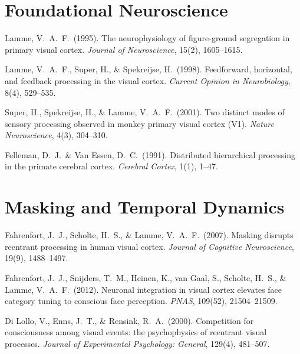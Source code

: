 \documentclass[11pt,a4paper]{report}
\begin{document}
\section*{Foundational Neuroscience}
\begin{enumerate}[label={[\arabic*]}, leftmargin=2.5em, start=6]
  \item Lamme, V.\ A.\ F.\ (1995). The neurophysiology of figure-ground segregation in primary visual cortex. \textit{Journal of Neuroscience}, 15(2), 1605--1615.
  \item Lamme, V.\ A.\ F., Super, H., \& Spekreijse, H.\ (1998). Feedforward, horizontal, and feedback processing in the visual cortex. \textit{Current Opinion in Neurobiology}, 8(4), 529--535.
  \item Super, H., Spekreijse, H., \& Lamme, V.\ A.\ F.\ (2001). Two distinct modes of sensory processing observed in monkey primary visual cortex (V1). \textit{Nature Neuroscience}, 4(3), 304--310.
  \item Felleman, D.\ J.\ \& Van Essen, D.\ C.\ (1991). Distributed hierarchical processing in the primate cerebral cortex. \textit{Cerebral Cortex}, 1(1), 1--47.
\end{enumerate}

\section*{Masking and Temporal Dynamics}
\begin{enumerate}[label={[\arabic*]}, leftmargin=2.5em, start=10]
  \item Fahrenfort, J.\ J., Scholte, H.\ S., \& Lamme, V.\ A.\ F.\ (2007). Masking disrupts reentrant processing in human visual cortex. \textit{Journal of Cognitive Neuroscience}, 19(9), 1488--1497.
  \item Fahrenfort, J.\ J., Snijders, T.\ M., Heinen, K., van Gaal, S., Scholte, H.\ S., \& Lamme, V.\ A.\ F.\ (2012). Neuronal integration in visual cortex elevates face category tuning to conscious face perception. \textit{PNAS}, 109(52), 21504--21509.
  \item Di Lollo, V., Enns, J.\ T., \& Rensink, R.\ A.\ (2000). Competition for consciousness among visual events: the psychophysics of reentrant visual processes. \textit{Journal of Experimental Psychology: General}, 129(4), 481--507.
\end{enumerate}
\end{document}
